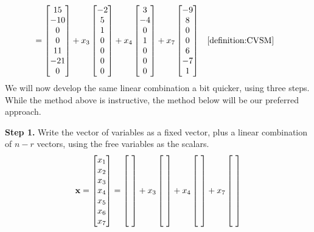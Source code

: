 \documentclass{ximera}
\begin{document}
\begin{example}
\begin{align*}
                                                 &=
                                                   \begin{bmatrix}15\\ -10\\ 0\\ 0\\ 11\\ -21\\ 0 \end{bmatrix}
    +
    x_3\begin{bmatrix} -2\\ 5\\ 1\\ 0\\ 0\\ 0\\ 0 \end{bmatrix}
    +
    x_4\begin{bmatrix} 3\\ -4\\ 0\\ 1\\ 0\\ 0\\ 0 \end{bmatrix}
    +
    x_7\begin{bmatrix} -9\\ 8\\ 0\\ 0\\ 6\\ -7\\ 1 \end{bmatrix}
                                                 &&\ref{definition:CVSM}
  \end{align*}
  We will now develop the same linear combination a bit quicker, using three steps.  While the method above is instructive, the method below will be our preferred approach.

  \textbf{Step 1.}  Write the vector of variables as a fixed vector,
  plus a linear combination of $n-r$ vectors, using the free variables
  as the scalars.
  \[
    \vect{x}=
    \colvector{x_1\\x_2\\x_3\\x_4\\x_5\\x_6\\x_7}=
    \colvector{\ \\\ \\\ \\\ \\\ \\\ \\\ }+x_3\colvector{\ \\\ \\\ \\\ \\\ \\\ \\\ }+x_4\colvector{\ \\\ \\\ \\\ \\\ \\\ \\\ }+x_7\colvector{\ \\\ \\\ \\\ \\\ \\\ \\\ }
  \]


\end{example}
\end{document}
